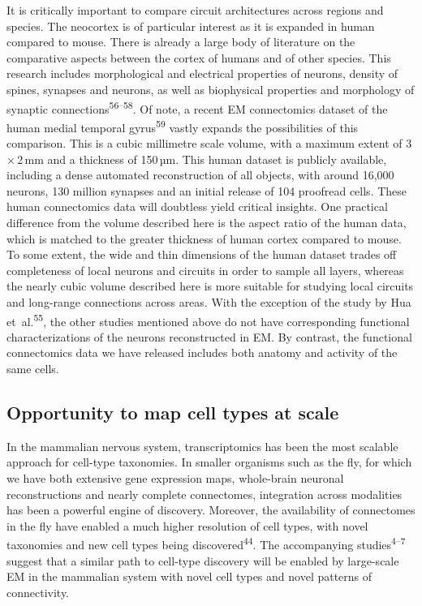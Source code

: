 \documentclass{article}
\begin{document}
It is critically important to compare circuit architectures across regions and species. The neocortex is of particular interest as it is expanded in human compared to mouse. There is already a large body of literature on the comparative aspects between the cortex of humans and of other species. This research includes morphological and electrical properties of neurons, density of spines, synapses and neurons, as well as biophysical properties and morphology of synaptic connections\textsuperscript{56–58}. Of note, a recent EM connectomics dataset of the human medial temporal gyrus\textsuperscript{59} vastly expands the possibilities of this comparison. This is a cubic millimetre scale volume, with a maximum extent of 3\,×\,2\,mm and a thickness of 150\,µm. This human dataset is publicly available, including a dense automated reconstruction of all objects, with around 16,000 neurons, 130 million synapses and an initial release of 104 proofread cells. These human connectomics data will doubtless yield critical insights. One practical difference from the volume described here is the aspect ratio of the human data, which is matched to the greater thickness of human cortex compared to mouse. To some extent, the wide and thin dimensions of the human dataset trades off completeness of local neurons and circuits in order to sample all layers, whereas the nearly cubic volume described here is more suitable for studying local circuits and long-range connections across areas. With the exception of the study by Hua et~al.\textsuperscript{55}, the other studies mentioned above do not have corresponding functional characterizations of the neurons reconstructed in EM. By contrast, the functional connectomics data we have released includes both anatomy and activity of the same cells.

\subsection*{Opportunity to map cell types at scale}

In the mammalian nervous system, transcriptomics has been the most scalable approach for cell-type taxonomies. In smaller organisms such as the fly, for which we have both extensive gene expression maps, whole-brain neuronal reconstructions and nearly complete connectomes, integration across modalities has been a powerful engine of discovery. Moreover, the availability of connectomes in the fly have enabled a much higher resolution of cell types, with novel taxonomies and new cell types being discovered\textsuperscript{44}. The accompanying studies\textsuperscript{4–7} suggest that a similar path to cell-type discovery will be enabled by large-scale EM in the mammalian system with novel cell types and novel patterns of connectivity.
\end{document}
